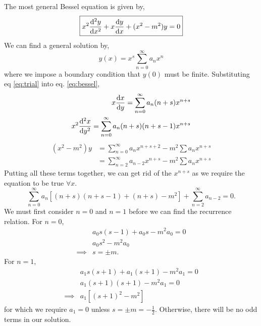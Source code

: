 \documentclass{book}
\begin{document}
The most general Bessel equation is given by,
\begin{equation}
	\boxed{x^2\dv[2]{y}{x} + x\dv{y}{x} + (x^2 - m^2)y = 0} \label{eq:bessel}
\end{equation}
We can find a general solution by,
\begin{equation}
	y(x) = x^s\sum_{n=0}^{\infty}a_nx^n \label{eq:trial}
\end{equation}
where we impose a boundary condition that $y(0)$ must be finite. Substituting eq \eqref{eq:trial} into eq. \eqref{eq:bessel},
\begin{align}
	x\dv{x}{y} = \sum_{n=0}^{\infty}a_n(n+s)x^{n+s} \\
	x^2\dv[2]{x}{y} = \sum_{n=0}^{\infty}a_n(n+s)(n+s-1)x^{n+s} \\
\end{align}
\begin{equation}
	\begin{split}
		(x^2 - m^2)y & = \sum_{n=0}^{\infty}a_nx^{n+s+2} - m^2\sum a_n x^{n+s} \\
		& = \sum_{n=2}^{\infty}a_{n-2}x^{n+s} - m^2\sum a_n x^{n+s}
	\end{split}
\end{equation}
Putting all these terms together, we can get rid of the $x^{n+s}$ as we require the equation to be true $\forall x$.
\begin{equation}
	\sum_{n=0}^{\infty}a_n\left[(n+s)(n+s-1) + (n+s) - m^2\right] + \sum_{n=2}^{\infty}a_{n-2} = 0.
\end{equation}
We must first consider $n=0$ and $n=1$ before we can find the recurrence relation. For $n=0$,
\begin{equation}
	\begin{split}
		& a_0s(s-1) + a_0s - m^2a_0 = 0 \\
		& a_0s^2 - m^2 a_0 \\
		\implies & s = \pm m.
	\end{split}
\end{equation}
For $n=1$,
\begin{equation}
	\begin{split}
		& a_1s(s+1) + a_1(s+1) - m^2a_1 = 0 \\
		& a_1 (s+1)(s+1) - m^2a_1 = 0 \\
		\implies & a_1\left[(s+1)^2 - m^2\right]
	\end{split}
\end{equation}
for which we require $a_1 = 0$ unless $s = \pm m = -\frac{1}{2}$. Otherwise, there will be no odd terms in our solution.
\end{document}
